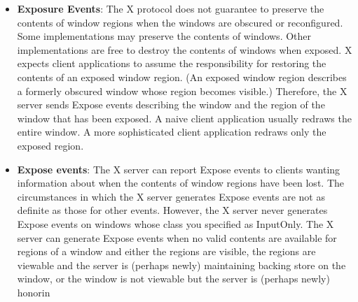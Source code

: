 \documentclass{report}
\begin{document}
\begin{itemize}
\begin{cppcode}
{                    Bool send_event;            /* true if this came from a SendEvent request */
                    Display *display;           /* Display the event was read from */
                    Window window;
                    char key_vector[32];
                } XKeymapEvent;
            \end{cppcode}
            \bigbreak \noindent 
            The window member is not used but is present to aid some toolkits. The key\_vector member is set to the bit vector of the keyboard. Each bit set to 1 indicates that the corresponding key is currently pressed. The vector is represented as 32 bytes. Byte N (from 0) contains the bits for keys $8N$ to $8N + 7$ with the least significant bit in the byte representing key 8N.
            \bigbreak \noindent 
            \textbf{Note:} KeymapNotify is an X event that gives a snapshot of the current keyboard state.
            \bigbreak \noindent 
            It does not mean “a key was pressed.” It means: “here is the current keymap state right now.” In practice, it tells you which physical keycodes are currently down.
            \bigbreak \noindent 
            The X server generates KeymapNotify immediately after an EnterNotify or FocusIn event when KeymapStateMask is selected. So it commonly appears when the pointer enters a window or when the keyboard focus moves to that window.
        \item \textbf{Exposure Events}: The X protocol does not guarantee to preserve the contents of window regions when the windows are obscured or reconfigured. Some implementations may preserve the contents of windows. Other implementations are free to destroy the contents of windows when exposed. X expects client applications to assume the responsibility for restoring the contents of an exposed window region. (An exposed window region describes a formerly obscured window whose region becomes visible.) Therefore, the X server sends Expose events describing the window and the region of the window that has been exposed. A naive client application usually redraws the entire window. A more sophisticated client application redraws only the exposed region.
        \item \textbf{Expose events}: The X server can report Expose events to clients wanting information about when the contents of window regions have been lost. The circumstances in which the X server generates Expose events are not as definite as those for other events. However, the X server never generates Expose events on windows whose class you specified as InputOnly. The X server can generate Expose events when no valid contents are available for regions of a window and either the regions are visible, the regions are viewable and the server is (perhaps newly) maintaining backing store on the window, or the window is not viewable but the server is (perhaps newly) honorin

\end{itemize}
\end{document}
